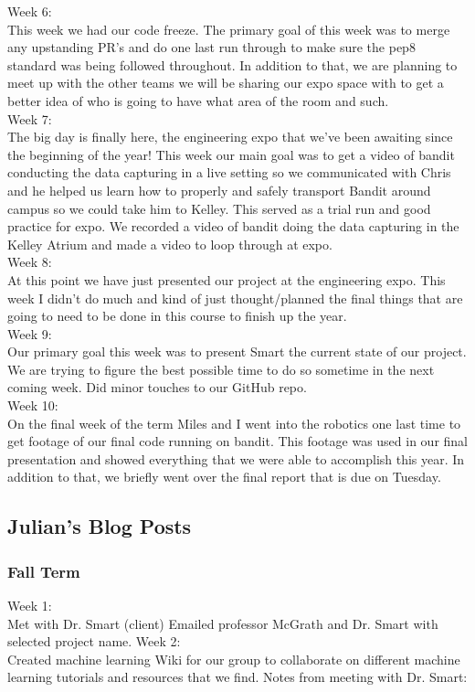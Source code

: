 \documentclass[draftclsnofoot, onecolumn, 10pt, compsoc]{IEEEtran}
\begin{document}
    	Week 6: \\ \indent This week we had our code freeze. The primary goal of this week was to merge any upstanding PR's and do one last run through to make sure the pep8 standard was being followed throughout. In addition to that, we are planning to meet up with the other teams we will be sharing our expo space with to get a better idea of who is going to have what area of the room and such. \\
    	Week 7: \\ \indent The big day is finally here, the engineering expo that we've been awaiting since the beginning of the year! This week our main goal was to get a video of bandit conducting the data capturing in a live setting so we communicated with Chris and he helped us learn how to properly and safely transport Bandit around campus so we could take him to Kelley. This served as a trial run and good practice for expo. We recorded a video of bandit doing the data capturing in the Kelley Atrium and made a video to loop through at expo. \\
    	Week 8: \\ \indent At this point we have just presented our project at the engineering expo. This week I didn't do much and kind of just thought/planned the final things that are going to need to be done in this course to finish up the year.  \\
    	Week 9: \\ \indent Our primary goal this week was to present Smart the current state of our project. We are trying to figure the best possible time to do so sometime in the next coming week. Did minor touches to our GitHub repo.   \\
    	Week 10: \\ \indent On the final week of the term Miles and I went into the robotics one last time to get footage of our final code running on bandit. This footage was used in our final presentation and showed everything that we were able to accomplish this year. In addition to that, we briefly went over the final report that is due on Tuesday.   \\        
  \subsection{Julian's Blog Posts}
  
  \subsubsection{Fall Term}
  Week 1:
  \\ \indent 
	Met with Dr. Smart (client)
Emailed professor McGrath and Dr. Smart with selected project name.
  Week 2:
  \\ \indent Created machine learning Wiki for our group to collaborate on different machine learning tutorials and resources that we find.
 Notes from meeting with Dr. Smart:
\end{document}
